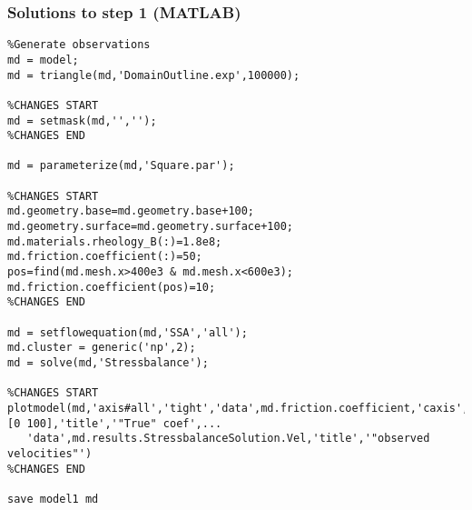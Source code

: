 \subsubsection{Solutions to step 1 (MATLAB)}
\begin{verbatim}%Generate observations
md = model;
md = triangle(md,'DomainOutline.exp',100000);

%CHANGES START
md = setmask(md,'','');
%CHANGES END

md = parameterize(md,'Square.par');

%CHANGES START
md.geometry.base=md.geometry.base+100;
md.geometry.surface=md.geometry.surface+100;
md.materials.rheology_B(:)=1.8e8;
md.friction.coefficient(:)=50;
pos=find(md.mesh.x>400e3 & md.mesh.x<600e3);
md.friction.coefficient(pos)=10;
%CHANGES END

md = setflowequation(md,'SSA','all');
md.cluster = generic('np',2);
md = solve(md,'Stressbalance');

%CHANGES START
plotmodel(md,'axis#all','tight','data',md.friction.coefficient,'caxis',[0 100],'title','"True" coef',...
   'data',md.results.StressbalanceSolution.Vel,'title','"observed velocities"')
%CHANGES END

save model1 md\end{verbatim}

